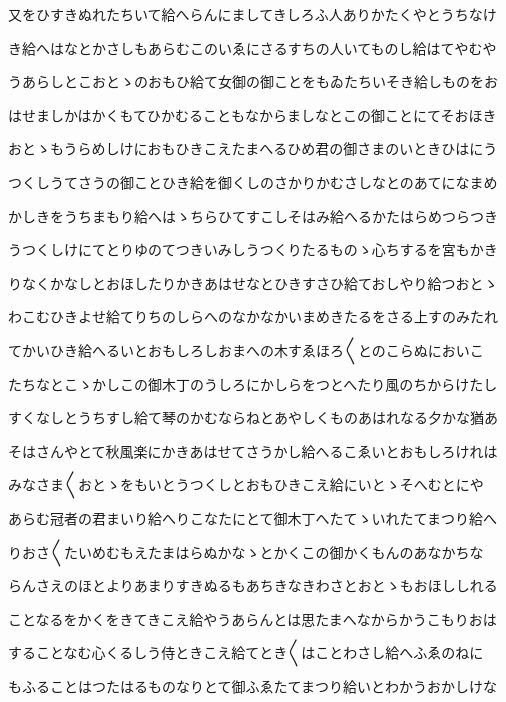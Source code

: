 \documentclass[a4paper,11pt,landscape]{ltjtarticle}
\begin{document}
\par\medskip
又をひすきぬれたちいて給へらんにましてきしろふ人ありかたくやとうちなけ
\par\medskip
き給へはなとかさしもあらむこのいゑにさるすちの人いてものし給はてやむや
\par\medskip
うあらしとこおとゝのおもひ給て女御の御ことをもゐたちいそき給しものをお
\par\medskip
はせましかはかくもてひかむることもなからましなとこの御ことにてそおほき
\par\medskip
おとゝもうらめしけにおもひきこえたまへるひめ君の御さまのいときひはにう
\par\medskip
つくしうてさうの御ことひき給を御くしのさかりかむさしなとのあてになまめ
\par\medskip
かしきをうちまもり給へはゝちらひてすこしそはみ給へるかたはらめつらつき
\par\medskip
うつくしけにてとりゆのてつきいみしうつくりたるものゝ心ちするを宮もかき
\par\medskip
りなくかなしとおほしたりかきあはせなとひきすさひ給ておしやり給つおとゝ
\par\medskip
わこむひきよせ給てりちのしらへのなかなかいまめきたるをさる上すのみたれ
\par\medskip
てかいひき給へるいとおもしろしおまへの木すゑほろ〱とのこらぬにおいこ
\par\medskip
たちなとこゝかしこの御木丁のうしろにかしらをつとへたり風のちからけたし
\par\medskip
すくなしとうちすし給て琴のかむならねとあやしくものあはれなる夕かな猶あ
\par\medskip
そはさんやとて秋風楽にかきあはせてさうかし給へるこゑいとおもしろけれは
\par\medskip
みなさま〱おとゝをもいとうつくしとおもひきこえ給にいとゝそへむとにや
\par\medskip
あらむ冠者の君まいり給へりこなたにとて御木丁へたてゝいれたてまつり給へ
\par\medskip
りおさ〱たいめむもえたまはらぬかなゝとかくこの御かくもんのあなかちな
\par\medskip
らんさえのほとよりあまりすきぬるもあちきなきわさとおとゝもおほししれる
\par\medskip
ことなるをかくをきてきこえ給やうあらんとは思たまへなからかうこもりおは
\par\medskip
することなむ心くるしう侍ときこえ給てとき〱はことわさし給へふゑのねに
\par\medskip
もふることはつたはるものなりとて御ふゑたてまつり給いとわかうおかしけな
\par\medskip
\end{document}
